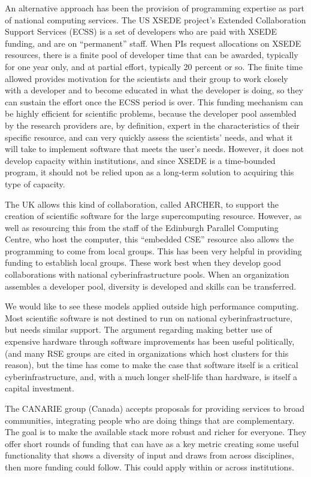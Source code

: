 An alternative approach has been the provision of programming expertise as part
of national computing services. The US XSEDE project's Extended Collaboration Support 
Services (ECSS) is a set of developers who are paid with XSEDE funding, and are
on ``permanent'' staff. When PIs request allocations on XSEDE resources, there
is a finite pool of developer time that can be awarded, typically for one year
only, and at partial effort, typically 20 percent or so. The finite time allowed
provides motivation for the scientists and their group to work closely with a
developer and to become educated in what the developer is doing, so they can
sustain the effort once the ECSS period is over. This funding mechanism can be
highly efficient for scientific problems, because the developer pool assembled
by the research providers are, by definition, expert in the characteristics of
their specific resource, and can very quickly assess the scientists' needs, and
what it will take to implement software that meets the user's needs. However, it
does not develop capacity within institutions, and since XSEDE is a time-bounded
program, it should not be relied upon as a long-term solution to acquiring this
type of capacity.

The UK allows this kind of collaboration, called ARCHER, to support the creation of scientific
software for the large supercomputing resource. However, as well
as resourcing this from the staff of the Edinburgh Parallel Computing Centre, 
who host the computer, this ``embedded CSE'' resource also allows the
programming to come from local groups. This has been very helpful in providing
funding to establish local groups. These work best when they develop good
collaborations with national cyberinfrastructure pools. When an organization
assembles a developer pool, diversity is developed and skills can be
transferred.

We would like to see these models applied outside high performance computing.
Most scientific software is not destined to run on national cyberinfrastructure,
but needs similar support. The argument regarding making better use of expensive
hardware through software improvements has been useful politically, (and many
RSE groups are cited in organizations which host clusters for this reason), but
the time has come to make the case that software itself is a critical
cyberinfrastructure, and, with a much longer shelf-life than hardware, is itself
a capital investment.

The CANARIE group (Canada) accepts proposals for providing services to broad
communities, integrating people who are doing things that are complementary. The
goal is to make the available stack more robust and richer for everyone. They
offer short rounds of funding that can have as a key metric creating some useful
functionality that shows a diversity of input and draws from across disciplines,
then more funding could follow.  This could apply within or across institutions.

